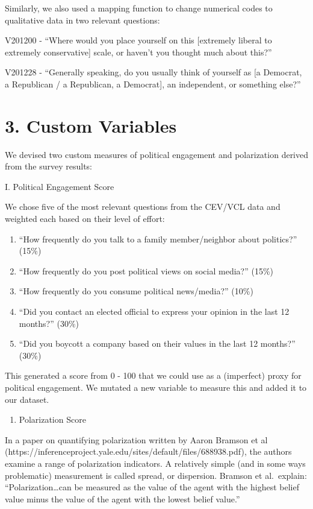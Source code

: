 \documentclass[
  letterpaper,
  DIV=11,
  numbers=noendperiod]{scrartcl}
\providecommand{\tightlist}{%
  \setlength{\itemsep}{0pt}\setlength{\parskip}{0pt}}\usepackage{longtable,booktabs,array}
\begin{document}
Similarly, we also used a mapping function to change numerical codes to
qualitative data in two relevant questions:

V201200 - ``Where would you place yourself on this {[}extremely liberal
to extremely conservative{]} scale, or haven't you thought much about
this?''

V201228 - ``Generally speaking, do you usually think of yourself as {[}a
Democrat, a Republican / a Republican, a Democrat{]}, an independent, or
something else?''

\section{3. Custom Variables}\label{custom-variables}

We devised two custom measures of political engagement and polarization
derived from the survey results:

I. Political Engagement Score

We chose five of the most relevant questions from the CEV/VCL data and
weighted each based on their level of effort:

\begin{enumerate}
\def\labelenumi{\arabic{enumi}.}
\tightlist
\item
  ``How frequently do you talk to a family member/neighbor about
  politics?'' (15\%)
\item
  ``How frequently do you post political views on social media?'' (15\%)
\item
  ``How frequently do you consume political news/media?'' (10\%)
\item
  ``Did you contact an elected official to express your opinion in the
  last 12 months?'' (30\%)
\item
  ``Did you boycott a company based on their values in the last 12
  months?'' (30\%)
\end{enumerate}

This generated a score from 0 - 100 that we could use as a (imperfect)
proxy for political engagement. We mutated a new variable to measure
this and added it to our dataset.

\begin{enumerate}
\def\labelenumi{\Roman{enumi}.}
\setcounter{enumi}{1}
\tightlist
\item
  Polarization Score
\end{enumerate}

In a paper on quantifying polarization written by Aaron Bramson et al
(https://inferenceproject.yale.edu/sites/default/files/688938.pdf), the
authors examine a range of polarization indicators. A relatively simple
(and in some ways problematic) measurement is called spread, or
dispersion. Bramson et al.~explain: ``Polarization\ldots can be measured
as the value of the agent with the highest belief value minus the value
of the agent with the lowest belief value.''
\end{document}
